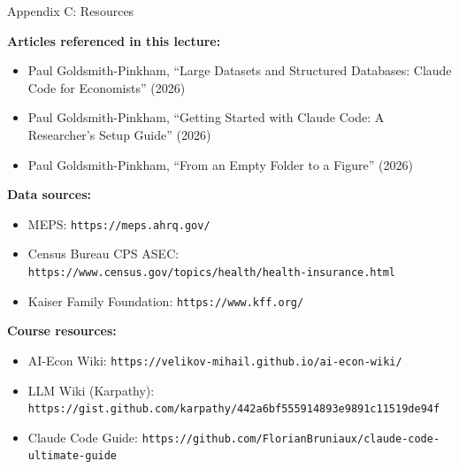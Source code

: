 \documentclass[10pt,english,aspectratio=169]{beamer}
\begin{document}
\begin{frame}{Appendix C: Resources}

\textbf{Articles referenced in this lecture:}
\begin{itemize}
    \item Paul Goldsmith-Pinkham, ``Large Datasets and Structured Databases: Claude Code for Economists'' (2026)
    \item Paul Goldsmith-Pinkham, ``Getting Started with Claude Code: A Researcher's Setup Guide'' (2026)
    \item Paul Goldsmith-Pinkham, ``From an Empty Folder to a Figure'' (2026)
\end{itemize}

\vspace{0.2cm}
\textbf{Data sources:}
\begin{itemize}
    \item MEPS: \texttt{https://meps.ahrq.gov/}
    \item Census Bureau CPS ASEC: \texttt{https://www.census.gov/topics/health/health-insurance.html}
    \item Kaiser Family Foundation: \texttt{https://www.kff.org/}
\end{itemize}

\vspace{0.2cm}
\textbf{Course resources:}
\begin{itemize}
    \item AI-Econ Wiki: \texttt{https://velikov-mihail.github.io/ai-econ-wiki/}
    \item LLM Wiki (Karpathy): \texttt{https://gist.github.com/karpathy/442a6bf555914893e9891c11519de94f}
    \item Claude Code Guide: \texttt{https://github.com/FlorianBruniaux/claude-code-ultimate-guide}
\end{itemize}

\end{frame}
\end{document}
